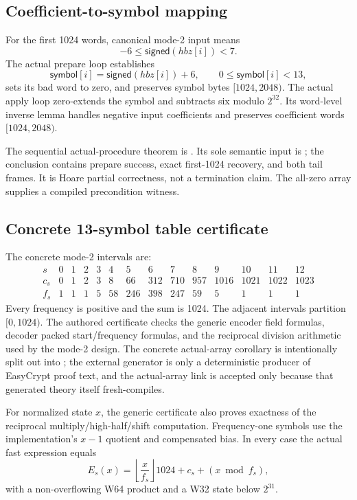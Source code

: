 \subsection*{Coefficient-to-symbol mapping}

For the first 1024 words, canonical mode-2 input means
\[
 -6 \leq \mathsf{signed}(hbz[i]) < 7.
\]
The actual prepare loop establishes
\[
 \mathsf{symbol}[i]=\mathsf{signed}(hbz[i])+6,
 \qquad 0\leq\mathsf{symbol}[i]<13,
\]
sets its bad word to zero, and preserves symbol bytes $[1024,2048)$.
The actual apply loop zero-extends the symbol and subtracts six modulo
$2^{32}$.  Its word-level inverse lemma handles negative input coefficients
and preserves coefficient words $[1024,2048)$.

The sequential actual-procedure theorem is
.  Its sole semantic input is
; the conclusion contains prepare success, exact
first-1024 recovery, and both tail frames.  It is Hoare partial correctness,
not a termination claim.  The all-zero array supplies a compiled
precondition witness.

\subsection*{Concrete 13-symbol table certificate}

The concrete mode-2 intervals are:
\[
\begin{array}{c|rrrrrrrrrrrrr}
s&0&1&2&3&4&5&6&7&8&9&10&11&12\\ \hline
c_s&0&1&2&3&8&66&312&710&957&1016&1021&1022&1023\\
f_s&1&1&1&5&58&246&398&247&59&5&1&1&1
\end{array}
\]
Every frequency is positive and the sum is 1024.  The adjacent intervals
partition $[0,1024)$.  The authored certificate checks the generic encoder
field formulas, decoder packed start/frequency formulas, and the reciprocal
division arithmetic used by the mode-2 design.  The concrete actual-array
corollary is intentionally split out into
; the external generator is only a
deterministic producer of EasyCrypt proof text, and the actual-array link is
accepted only because that generated theory itself fresh-compiles.

For normalized state $x$, the generic certificate also proves exactness of the
reciprocal multiply/high-half/shift computation.  Frequency-one symbols use
the implementation's $x-1$ quotient and compensated bias.  In every case the
actual fast expression equals
\[
 E_s(x)=\left\lfloor\frac{x}{f_s}\right\rfloor 1024
       +c_s+(x\bmod f_s),
\]
with a non-overflowing W64 product and a W32 state below $2^{31}$.

